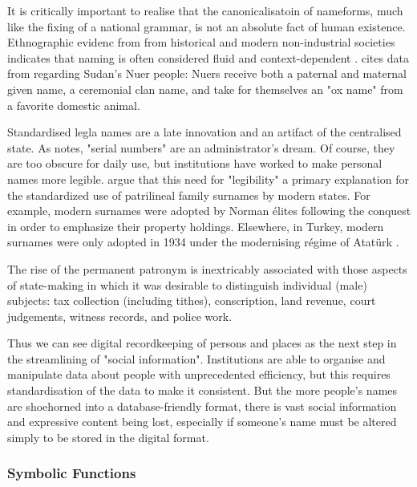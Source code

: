 It is critically important to realise that the canonicalisatoin of nameforms,
much like the fixing of a national grammar, is not an absolute fact of human
existence. Ethnographic evidenc from from historical and modern non-industrial societies indicates that
naming is often considered fluid and context-dependent \textcite{alford87}. \textcite{wardhaugh92} cites data from
\textcite{evans-pritchard48} regarding Sudan's Nuer people: Nuers receive both a
paternal and maternal given name, a ceremonial clan name, and take for
themselves an "ox name" from a favorite domestic animal.

Standardised legla names are a late innovation and an artifact of the
centralised state. As \textcite{scott02} notes, "serial numbers" are an
administrator's dream. Of course, they are too obscure for daily use, but
institutions have worked to make personal names more legible. \textcite{scott02}
argue that this need for "legibility" a primary explanation for the standardized
use of patrilineal family surnames by modern states. For example, modern
surnames were adopted by Norman élites following the conquest in order to
emphasize their property holdings. Elsewhere, in Turkey, modern surnames were
only adopted in 1934 under the modernising régime of Atatürk
\parencite{scott02}.

\begin{aquote}{\parencite{scott02}}
The rise of the permanent patronym is inextricably associated with those aspects
	of state-making in which it was desirable to distinguish individual (male)
	subjects: tax collection (including tithes), conscription, land revenue, court
	judgements, witness records, and police work.
\end{aquote}

Thus we can see digital recordkeeping of persons and places as the next step in
the streamlining of "social information". Institutions are able to organise and
manipulate data about people with unprecedented efficiency, but this requires
standardisation of the data to make it consistent. But the more people's names
are shoehorned into a database-friendly format, there is vast social information
and expressive content being lost, especially if someone's name must be altered
simply to be stored in the digital format.

\subsubsection{Symbolic Functions}


